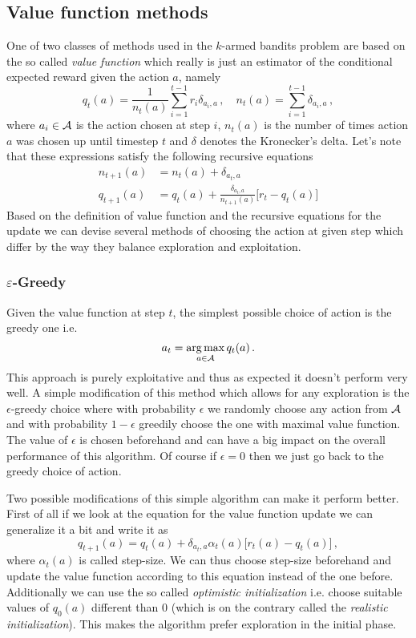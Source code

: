 \documentclass{myclass}
\begin{document}
\subsection{Value function methods}

One of two classes of methods used in the $k$-armed bandits problem are based on the so called
\emph{value function} which really is just an estimator of the conditional expected reward given the
action $a$, namely
\[
    q_t(a) = \frac{1}{n_t(a)} \sum_{i=1}^{t-1} r_i \delta_{a_i,a}\,,\quad n_t(a) = \sum_{i=1}^{t-1} \delta_{a_i,a}\,,
\]
where $a_i \in \mathcal{A}$ is the action chosen at step $i$, $n_t(a)$ is the number of times action $a$
was chosen up until timestep $t$ and $\delta$ denotes the Kronecker's delta. Let's note that these
expressions satisfy the following recursive equations
\[
\boxed
{
\begin{split}
    n_{t+1}(a) &= n_{t}(a) + \delta_{a_t,a}\\
    q_{t+1}(a) &= q_t(a) + \frac{\delta_{a_t, a}}{n_{t+1}(a)}\big[ r_t  - q_t(a) \big]
\end{split}
}
\]
Based on the definition of value function and the recursive equations for the update we can devise
several methods of choosing the action at given step which differ by the way they balance
exploration and exploitation.

\subsubsection{$\varepsilon$-Greedy}

Given the value function at step $t$, the simplest possible choice of action is the greedy one i.e.
\[
    a_t = \operatorname*{arg\,max}_{a \in \mathcal{A}} q_t(a)\,.
\]
This approach is purely exploitative and thus as expected it doesn't perform very well. A simple
modification of this method which allows for any exploration is the $\epsilon$-greedy choice where
with probability $\epsilon$ we randomly choose any action from $\mathcal{A}$ and with probability
$1-\epsilon$ greedily choose the one with maximal value function. The value of $\epsilon$ is chosen
beforehand and can have a big impact on the overall performance of this algorithm. Of course if
$\epsilon = 0$ then we just go back to the greedy choice of action.

Two possible modifications of this simple algorithm can make it perform better. First of all if we
look at the equation for the value function update we can generalize it a bit and write it as
\[
    q_{t+1}(a) = q_{t}(a) + \delta_{a_t,a} \alpha_t(a) \big[ r_t(a) - q_t(a) \big]\,,
\]
where $\alpha_t(a)$ is called step-size. We can thus choose step-size beforehand and update the
value function according to this equation instead of the one before. Additionally we can use the so
called \emph{optimistic initialization} i.e. choose suitable values of $q_0(a)$ different than 0
(which is on the contrary called the \emph{realistic initialization}). This makes the algorithm
prefer exploration in the initial phase.
\end{document}
